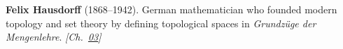 \textbf{Felix Hausdorff} (1868–1942). German mathematician who founded modern topology and set theory by defining topological spaces in \emph{Grundz\"{u}ge der Mengenlehre}. \emph{[Ch.~\hyperref[ch:banach]{03}]}

